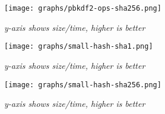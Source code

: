 \begin{figure}[htpb]
\centering
\caption{\small \sl y-axis shows size/time, higher is better
\label{fig:pbkdf2-ops-sha256}}
\texttt{[image: graphs/pbkdf2-ops-sha256.png]}
\end{figure}

\begin{figure}[htpb]
\centering
\texttt{[image: graphs/small-hash-sha1.png]}
\caption{\small \sl y-axis shows size/time, higher is better
\label{fig:small-hash-sha1}}
\end{figure}

\begin{figure}[htpb]
\centering
\caption{\small \sl y-axis shows size/time, higher is better
\label{fig:small-hash-sha256}}
\texttt{[image: graphs/small-hash-sha256.png]}
\end{figure}

